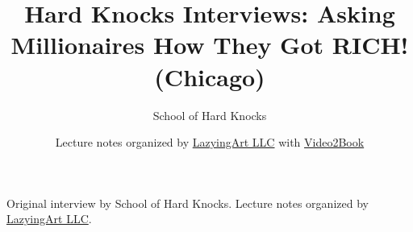 \documentclass[11pt,oneside]{book}
\begin{document}
\frontmatter
\title{Hard Knocks Interviews: Asking Millionaires How They Got RICH! (Chicago)}
\author{School of Hard Knocks}
\date{Lecture notes organized by \href{https://lazying.art}{LazyingArt LLC} with \href{https://github.com/lachlanchen/Video2Book}{Video2Book}}
\maketitle
\begin{center}
\small Original interview by School of Hard Knocks. Lecture notes organized by \href{https://lazying.art}{LazyingArt LLC}.
\end{center}
\clearpage
\mainmatter

\end{document}
